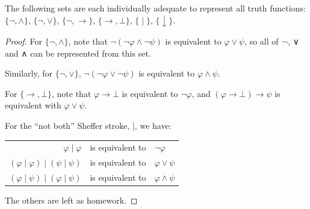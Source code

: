 \documentclass[12pt]{report}
\theoremstyle{nonumberplain}
\newtheorem{proof}{Proof}
\begin{document}
\begin{coro}
The following sets are each individually adequate to represent all truth functions:\\
$\{ ¬, ∧ \}$,
$\{ ¬, ∨ \}$,
$\{ ¬, → \}$,
$\{ →, ⊥ \}$,
$\{ \mathrel{|} \}$, $\{ \downarrow \}$.
\end{coro}
\begin{proof}
For $\{ ¬, ∧ \}$, note that $¬(¬φ ∧ ¬ψ)$ is equivalent to $φ ∨ ψ$, so all of ¬, ∨ and ∧ can be represented from this set.

Similarly, for $\{ ¬, ∨ \}$, $¬(¬φ ∨ ¬ψ)$ is equivalent to $φ ∧ ψ$.

For $\{ →, ⊥ \}$, note that $φ → ⊥$ is equivalent to $¬φ$, and $(φ → ⊥) → ψ$ is equivalent with $φ ∨ ψ$.

For the ``not both'' Sheffer stroke, \textup{|}, we have:\\
\noindent\begin{tabular}{@{}rcl}
$φ \mathrel{|} φ$ &is equivalent to &$¬φ$\\
$(φ \mathrel{|} φ) \mathrel{|} (ψ \mathrel{|} ψ)$ &is equivalent to &$φ ∨ ψ$\\
$(φ \mathrel{|} ψ) \mathrel{|} (φ \mathrel{|} ψ)$ &is equivalent to &$φ ∧ ψ$
\end{tabular}

\bigskip\noindent The others are left as homework.
\end{proof}
\end{document}
